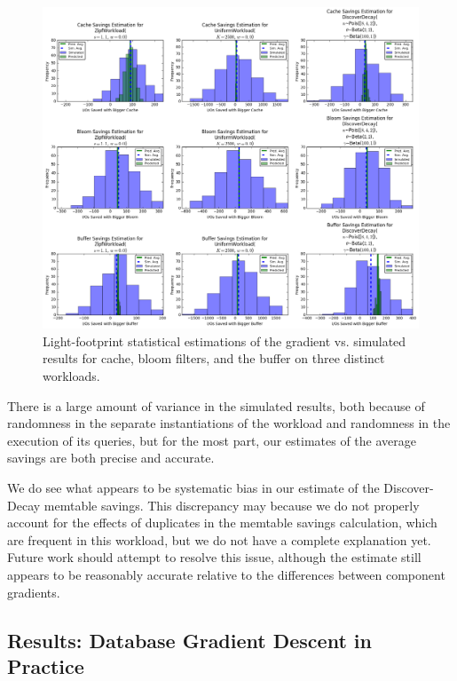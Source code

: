 \documentclass{sig-alternate-05-2015}
\begin{document}
\begin{figure}[!htb]
\begin{center}
\includegraphics[width=\textwidth]{all-savings.png}
\end{center}
\caption{Light-footprint statistical estimations of the gradient vs. simulated
results for cache, bloom filters, and the buffer on three distinct workloads.}
\label{fig:savings}
\end{figure}

There is a large amount of variance in the simulated results, both because of
randomness in the separate instantiations of the workload and randomness in
the execution of its queries, but for the most part, our estimates of the average
savings are both precise and accurate.

We do see what appears to be systematic bias in our estimate of the
Discover-Decay memtable savings. This discrepancy may because we do not
properly account for the effects of duplicates in the memtable savings
calculation, which are frequent in this workload, but we do not have a complete
explanation yet. Future work should attempt to resolve this issue, although the
estimate still appears to be reasonably accurate relative to the differences
between component gradients.

\subsection{Results: Database Gradient Descent in Practice}
\end{document}
